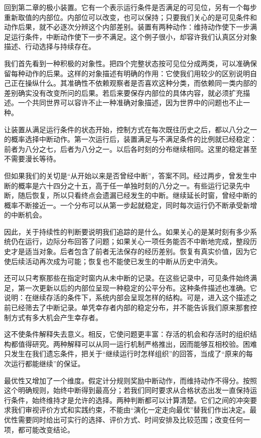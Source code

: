\documentclass[
  11pt,
  oneside]{book}
\begin{document}
回到第二章的极小装置。它有一个表示运行条件是否满足的可见位，另有一个每步重新取值的内部位。内部位可以改变，也可以保持；只要我们关心的是可见条件和动作后果，就不必逐次分辨这个内部差别。装置有两种动作：维持动作使下一步满足运行条件，中断动作使下一步不满足。这个例子很小，却容许我们认真区分对象描述、行动选择与持续存在。

我们首先看到一种积极的对象性。把四个完整状态按可见位分成两类，可以准确保留每种动作的后果。这样的对象描述有明确的作用：它使我们用较少的区别说明自己正在操纵什么。其准确性不依赖观察者是否喜欢这种分类，而依赖同一类内部的差别确实没有改变所问的后果。若后来要保存内部位的具体内容，就必须扩充描述。一个共同世界可以容许不止一种准确对象描述，因为世界中的问题也不止一种。

让装置从满足运行条件的状态开始，控制方式在每次既往历史之后，都以八分之一的概率选择中断动作。第一次运行后，装置满足与不满足条件的比例就已经稳定：前者为八分之七，后者为八分之一。以后各时刻的分布继续相同。这里的稳定甚至不需要漫长等待。

但如果我们的关切是``从开始以来是否曾经中断''，答案不同。经过两步，曾发生中断的概率是六十四分之十五，高于任一单独时刻的八分之一。有些运行记录先中断，随后恢复，所以只看终点会遗漏已经发生的中断。继续延长时窗，曾经中断的概率不断接近一。一个分布可以从第一步起就稳定，同时每次运行仍不断承受新增的中断机会。

因此，关于持续性的判断要说明我们追踪的是什么。如果关心的是某时刻有多少系统仍在运行，边际分布回答了问题；如果关心一项任务能否不中断地完成，整段历史才是适当对象。后者包含了前者无法保存的经历差别。恢复有真实价值，因为它使后续活动再次成为可能；恢复也不能使已发生的中断从历史中消失。

还可以只考察那些在指定时窗内从未中断的记录。在这些记录中，可见条件始终满足，第一次更新以后的内部位呈现一种稳定的公平分布。这种条件描述也准确。它说明：在继续存活的条件下，系统内部会呈现怎样的结构。可是，进入这个描述之前已经筛去了中断记录。单凭幸存者内部的稳定分布，并不能告诉我们原来那套控制方式有多大机会产生幸存者。

这不使条件解释失去意义。相反，它使问题更丰富：存活的机会和存活时的组织结构都值得研究。两种解释可以从同一运行机制严格推出，因而能够互相校验。困难只发生在我们遗忘条件，把关于``继续运行时怎样组织''的回答，当成了``原来的每次运行都能继续''的保证。

最优性又增加了一个维度。假定计分规则奖励中断动作，而维持动作不得分。按照这个明确规则，始终中断得到最高分；若我们同时要求从合格状态出发一直保持运行条件，始终维持才是允许的选择。两种判断都可以计算清楚。它们之间的冲突要求我们审视评价方式和实践约束，不能由``演化一定走向最优''替我们作出决定。最优性需要同时给出可实行的选择、评价方式、时间安排及比较范围；改变任何一项，都可能改变结论。
\end{document}
